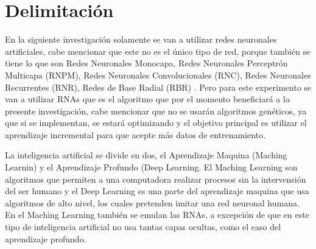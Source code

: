 \section{Delimitación}
\label{sec:delimitation}

    En la siguiente investigación solamente se van a utilizar redes neuronales artificiales, 
    cabe mencionar que este no es el único tipo de red, porque también se tiene lo que son Redes Neuronales Monocapa,
    Redes Neuronales Perceptrón Multicapa (RNPM), Redes Neuronales Convolucionales (RNC), Redes Neuronales Recurrentes (RNR),
    Redes de Base Radial (RBR) \cite{royo2021}. Pero para este experimento se van a utilizar RNAs que es el algoritmo que 
    por el momento beneficiar\'a a la presente investigación, cabe mencionar que no se usar\'an algoritmos genéticos, 
    ya que si se implementan, se estará optimizando y el objetivo principal es utilizar el aprendizaje incremental 
    para que acepte más datos de entrenamiento.
    
    La inteligencia artificial se divide en dos, el Aprendizaje Maquina (Maching Learnin) y el Aprendizaje 
    Profundo (Deep Learning. El Maching Learning son algoritmos que permiten a una computadora realizar 
    procesos sin la intervensi\'on del ser humano y el Deep Learning es una parte del aprendizaje maquina
    que usa algoritmos de alto nivel, los cuales pretenden imitar una red neuronal humana. En el Maching Learning
    tambi\'en se emulan las RNAs, a excepci\'on de que en este tipo de inteligencia artificial no usa tantas
    capas ocultas, como el caso del aprendizaje profundo.
